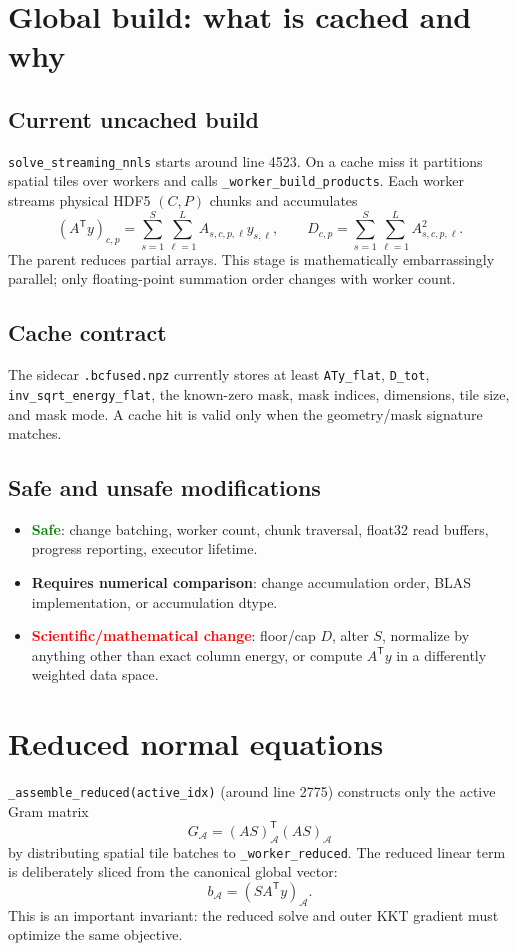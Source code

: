 \documentclass[10pt,a4paper]{article}
\newcommand{\code}[1]{\texttt{#1}}
\newcommand{\risk}[1]{\textcolor{red}{\textbf{#1}}}
\newcommand{\safe}[1]{\textcolor{green}{\textbf{#1}}}
\newcommand{\warn}[1]{\textcolor{amber}{\textbf{#1}}}
\begin{document}
\section{Global build: what is cached and why}
\subsection{Current uncached build}
\code{solve\_streaming\_nnls} starts around line 4523. On a cache miss it partitions spatial tiles over workers and calls \code{\_worker\_build\_products}. Each worker streams physical HDF5 $(C,P)$ chunks and accumulates
\[
(A^{\mathsf T}y)_{c,p}=\sum_{s=1}^{S}\sum_{\ell=1}^{L}A_{s,c,p,\ell}y_{s,\ell},
\qquad
D_{c,p}=\sum_{s=1}^{S}\sum_{\ell=1}^{L}A_{s,c,p,\ell}^2.
\]
The parent reduces partial arrays. This stage is mathematically embarrassingly parallel; only floating-point summation order changes with worker count.

\subsection{Cache contract}
The sidecar \code{.bcfused.npz} currently stores at least \code{ATy\_flat}, \code{D\_tot}, \code{inv\_sqrt\_energy\_flat}, the known-zero mask, mask indices, dimensions, tile size, and mask mode. A cache hit is valid only when the geometry/mask signature matches.

\subsection{Safe and unsafe modifications}
\begin{itemize}
\item \safe{Safe}: change batching, worker count, chunk traversal, float32 read buffers, progress reporting, executor lifetime.
\item \warn{Requires numerical comparison}: change accumulation order, BLAS implementation, or accumulation dtype.
\item \risk{Scientific/mathematical change}: floor/cap $D$, alter $S$, normalize by anything other than exact column energy, or compute $A^{\mathsf T}y$ in a differently weighted data space.
\end{itemize}

\section{Reduced normal equations}
\code{\_assemble\_reduced(active\_idx)} (around line 2775) constructs only the active Gram matrix
\[
G_{\mathcal A}=(AS)_{\mathcal A}^{\mathsf T}(AS)_{\mathcal A}
\]
by distributing spatial tile batches to \code{\_worker\_reduced}. The reduced linear term is deliberately sliced from the canonical global vector:
\[
b_{\mathcal A}=(SA^{\mathsf T}y)_{\mathcal A}.
\]
This is an important invariant: the reduced solve and outer KKT gradient must optimize the same objective.
\end{document}
